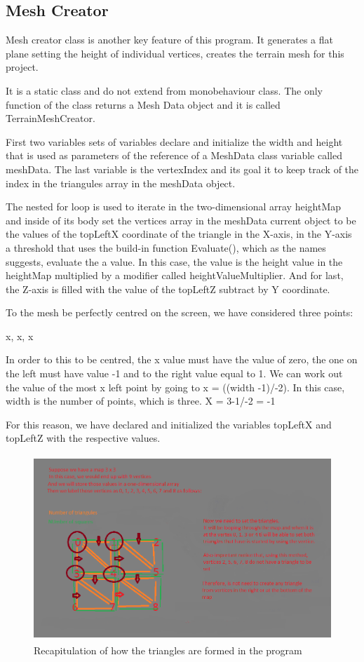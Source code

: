 \documentclass[a4paper,12pt]{book}
\begin{document}
\subsection{Mesh Creator}

Mesh creator class is another key feature of this program. It generates a flat plane setting the height of individual vertices, creates the terrain mesh for this project.

It is a static class and do not extend from monobehaviour class.
The only function of the class returns a Mesh Data object and it is called TerrainMeshCreator.

First two variables sets of variables declare and initialize the width and height that is used as parameters of the reference of a MeshData class variable called meshData.  The last variable is the vertexIndex and its goal it to keep track of the index in the triangules array in the meshData object.

The nested for loop is used to iterate in the two-dimensional array heightMap and inside of its body set the vertices array in the meshData current object to be the values of the topLeftX coordinate of the triangle in the X-axis, in the Y-axis a threshold that uses the build-in function Evaluate(), which as the names suggests, evaluate the a value. In this case, the value is the height value in the heightMap multiplied by a modifier called heightValueMultiplier. And for last, the Z-axis is filled with the value of the topLeftZ subtract by Y coordinate.

To the mesh be perfectly centred on the screen, we have considered three points: 

x, x, x

In order to this to be centred, the x value must have the value of zero, the one on the left must have value -1 and to the right value equal to 1.
We can work out the value of the most x left point by going to x = ((width -1)/-2). In this case, width is the number of points, which is three. X = 3-1/-2 = -1

For this reason, we have declared and initialized the variables topLeftX and topLeftZ with the respective values.

\begin{figure}
\begin{center}
\includegraphics[height=70mm]{mesh_research_6.png}
\end{center}
\caption{Recapitulation of how the triangles are formed in the program}
\label{fig:pretty}
\end{figure}
 
\end{document}
